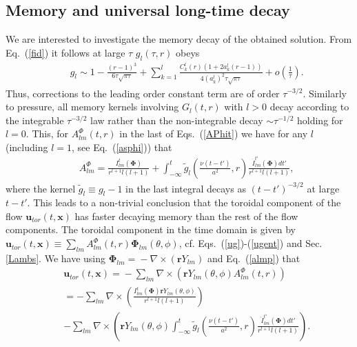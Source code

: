 \documentclass[aps,prx,twocolumn,amsmath,amssymb,amsfonts]{revtex4-2}
\begin{document}
\subsection{Memory and universal long-time decay}

We are interested to investigate the memory decay of the obtained solution. From Eq.~(\ref{fid}) it follows at large $\tau$ $g_l(\tau, r)$ obeys
\begin{eqnarray}&&\!\!\!\!\!\!\!\!\!\!\!
g_l\!\sim \!1\!-\!\frac{(r\!-\!1)^3}{6\tau\sqrt{\pi\tau}}
\!+\!\sum_{k=1}^{l}\!\frac{C_k^{l}(r)\left(1\!+\!2a_k^{l}(r\!-\!1)\right)}{4(a_k^{l})^2\tau\sqrt{\pi\tau}}\!+\!o\left(\!\frac{1}{\tau}\!\right).
\end{eqnarray}
Thus, corrections to the leading order constant term are of order $\tau^{-3/2}$. Similarly to pressure, all memory kernels involving $G_l(t, r)$ with $l>0$ decay according to the integrable $\tau^{-3/2}$ law rather than the
non-integrable decay $\sim \tau^{-1/2}$ holding for $l=0$. This, for $A_{lm}^{\Phi}(t, r)$ in the last of Eqs.~(\ref{APhit}) we have for any $l$ (including $l=1$, see Eq.~(\ref{asphi})) that
\begin{eqnarray}&&\!\!\!\!\!\!\!\!\!\!\!
A_{lm}^{\Phi}\! =\!\frac{I_{lm}^{t}(\bm \Phi)}{r^{l+1}l(l\!+\!1)}
\!+\!\!\int_{-\infty}^{t}\!\!{\tilde g}_l\left(\!\frac{\nu(t\!-\!t')}{a^2}, r\!\right) \!\frac{\dot{I}_{lm}^{t'}(\bm \Phi)dt'}{r^{l+1}l(l\!+\!1)},\label{almp}%
\end{eqnarray}
where the kernel ${\tilde g}_l\equiv g_l-1$ in the last integral decays as $(t-t')^{-3/2}$ at large $t-t'$. This leads to a non-trivial conclusion that the toroidal component of the flow $\bm u_{tor}(t, \bm x)$ has faster decaying memory than the rest of the flow components. The toroidal component in the time domain is given by $\bm u_{tor}(t, \bm x)\equiv \sum_{lm}A_{lm}^{\Phi}(t, r)\bm \Phi_{lm}(\theta, \phi)$, cf. Eqs.~(\ref{ug})-(\ref{ugent}) and Sec. \ref{Lambs}. We have using $\bm \Phi_{lm}\!=\!-\nabla\!\times\! (\bm r Y_{lm})$ and Eq.~(\ref{almp}) that
\begin{eqnarray}&&
\bm u_{tor}(t, \bm x) \!= \!-\sum_{lm}\nabla\!\times\! (\bm r Y_{lm}(\theta, \phi) A_{lm}^{\Phi}(t, r))\\&&
=-\sum_{lm}\nabla\!\times\! \left(\frac{I_{lm}^{t}(\bm \Phi)\bm r Y_{lm}(\theta, \phi)}{r^{l+1}l(l\!+\!1)}\right) \nonumber\\&&
-\sum_{lm}\nabla\!\times\! \left(\bm r Y_{lm}(\theta, \phi)\int_{-\infty}^{t}\!\!{\tilde g}_l\left(\!\frac{\nu(t\!-\!t')}{a^2}, r\!\right)\frac{\dot{I}_{lm}^{t'}(\bm \Phi)dt'}{r^{l+1}l(l\!+\!1)}\right).\nonumber
\end{eqnarray}
\end{document}
